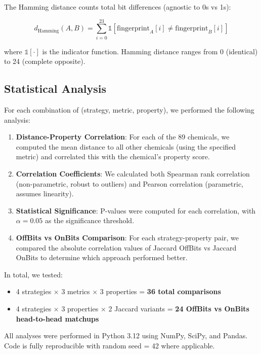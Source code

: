 \documentclass[11pt,letterpaper]{article}
\begin{document}
The Hamming distance counts total bit differences (agnostic to 0s vs 1s):

\begin{equation}
d_{\text{Hamming}}(A, B) = \sum_{i=0}^{23} \mathbb{1}[\text{fingerprint}_A[i] \neq \text{fingerprint}_B[i]]
\end{equation}

where $\mathbb{1}[\cdot]$ is the indicator function. Hamming distance ranges from 0 (identical) to 24 (complete opposite).

\subsection{Statistical Analysis}

For each combination of (strategy, metric, property), we performed the following analysis:

\begin{enumerate}
    \item \textbf{Distance-Property Correlation}: For each of the 89 chemicals, we computed the mean distance to all other chemicals (using the specified metric) and correlated this with the chemical's property score.

    \item \textbf{Correlation Coefficients}: We calculated both Spearman rank correlation (non-parametric, robust to outliers) and Pearson correlation (parametric, assumes linearity).

    \item \textbf{Statistical Significance}: P-values were computed for each correlation, with $\alpha = 0.05$ as the significance threshold.

    \item \textbf{OffBits vs OnBits Comparison}: For each strategy-property pair, we compared the absolute correlation values of Jaccard OffBits vs Jaccard OnBits to determine which approach performed better.
\end{enumerate}

In total, we tested:
\begin{itemize}
    \item 4 strategies $\times$ 3 metrics $\times$ 3 properties = \textbf{36 total comparisons}
    \item 4 strategies $\times$ 3 properties $\times$ 2 Jaccard variants = \textbf{24 OffBits vs OnBits head-to-head matchups}
\end{itemize}

All analyses were performed in Python 3.12 using NumPy, SciPy, and Pandas. Code is fully reproducible with random seed = 42 where applicable.
\end{document}
